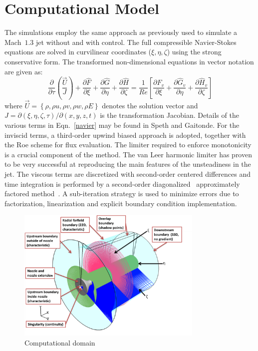 \documentclass[english]{aiaa-tc}
\begin{document}
\section{Computational Model}\label{theo}
The simulations employ the same approach as previously used
to simulate a Mach~$1.3$ jet without and with
control\cite{gdv2011-POF,SpethCF2013}.  The full compressible
Navier-Stokes equations are solved in curvilinear coordinates
($\xi,\eta,\zeta$) using the
strong conservative form\cite{vm74-1,sjl78-1}. The transformed
non-dimensional equations in 
vector notation are given as: 
\begin{equation}
\frac{\partial}{\partial\tau}\left(\frac{\vec{U}}{J}\right)+\frac{\partial\hat{F}}{\partial\xi}+\frac{\partial\hat{G}}{\partial\eta}+\frac{\partial\hat{H}}{\partial\zeta}=\frac{1}{Re}\left[\frac{\partial\hat{F}_{v}}{\partial\xi}+\frac{\partial\hat{G}_{v}}{\partial\eta}+\frac{\partial\hat{H}_{v}}{\partial\zeta}\right]\label{navier}
\end{equation}
where $\vec{U}=\left\{ \rho,\rho u,\rho v,\rho w,\rho E\right\} $
denotes the solution vector and
$J=\partial\left(\xi,\eta,\zeta,\tau\right)/\partial\left(x,y,z,t\right)$
is the transformation Jacobian.  Details of the various terms in
Eqn.~\ref{navier} may be found in Speth and 
Gaitonde\cite{speth2012b}.
For the inviscid terms, a third-order upwind biased approach is
adopted, together with the Roe scheme\cite{rpl81-1} for flux evaluation.  The
limiter required to enforce monotonicity is a crucial 
component of the method.  The van Leer harmonic limiter\cite{lbv79-1}
has proven to be very successful at reproducing the main features of the
unsteadiness in the jet.  The viscous 
terms are discretized with second-order centered differences and time
integration is performed by a second-order diagonalized~\cite{pth81-1}
approximately 
factored method~\cite{br78-1}.  A sub-iteration
strategy is used to minimize errors due to factorization, linearization and
explicit boundary condition implementation.
\begin{figure}
\begin{center}
	\includegraphics[width=3.5in]{MACH09ComputationalDomain1.png}
\caption{Computational domain}\label{fig:M09Computationaldomain}
\end{center}
 \end{figure}
\end{document}
